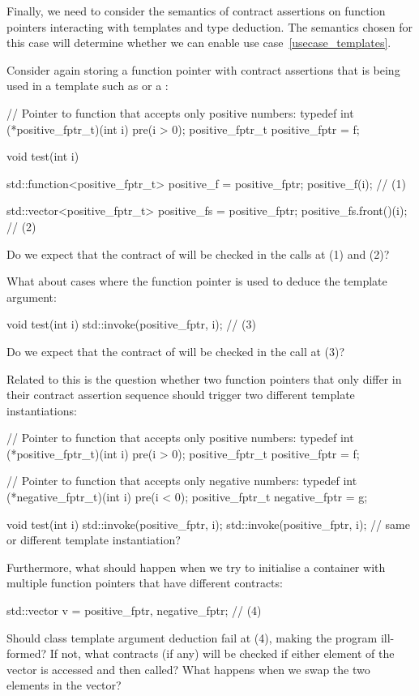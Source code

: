 Finally, we need to consider the semantics of contract assertions on function pointers interacting with templates and type deduction. The semantics chosen for this case will determine whether we can enable use case~\ref{usecase_templates}.

Consider again storing a function pointer with contract assertions that is being used in a template such as  or a :
\begin{codeblock}
// Pointer to function that accepts only positive numbers:
typedef int (*positive_fptr_t)(int i) pre(i > 0);
positive_fptr_t positive_fptr = f;

void test(int i) {
  std::function<positive_fptr_t> positive_f = positive_fptr;
  positive_f(i);  // (1)
  
  std::vector<positive_fptr_t> positive_fs = {positive_fptr};
  positive_fs.front()(i);  // (2)
}
\end{codeblock}
Do we expect that the contract of  will be checked in the calls at (1) and (2)?

What about cases where the function pointer is used to deduce the template argument:
\begin{codeblock}
void test(int i) {
  std::invoke(positive_fptr, i);  // (3)
}
\end{codeblock}
Do we expect that the contract of  will be checked in the call at (3)?

Related to this is the question whether two function pointers that only differ in their contract assertion sequence should trigger two different template instantiations:
\begin{codeblock}
// Pointer to function that accepts only positive numbers:
typedef int (*positive_fptr_t)(int i) pre(i > 0);
positive_fptr_t positive_fptr = f;

// Pointer to function that accepts only negative numbers:
typedef int (*negative_fptr_t)(int i) pre(i < 0);
positive_fptr_t negative_fptr = g;

void test(int i) {
  std::invoke(positive_fptr, i);
  std::invoke(positive_fptr, i);  // same or different template instantiation?
}
\end{codeblock}
Furthermore, what should happen when we try to initialise a container with multiple function pointers that have different contracts:
\begin{codeblock}
std::vector v = {positive_fptr, negative_fptr};  // (4)
\end{codeblock}
Should class template argument deduction fail at (4), making the program ill-formed? If not, what contracts (if any) will be checked if either element of the vector is accessed and then called? What happens when we swap the two elements in the vector?


